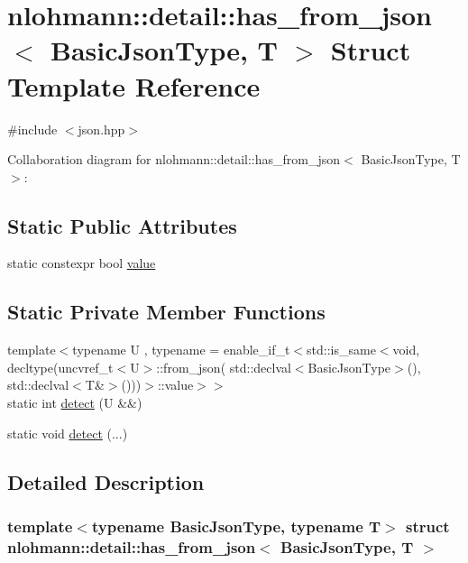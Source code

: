 \hypertarget{structnlohmann_1_1detail_1_1has__from__json}{}\section{nlohmann\+:\+:detail\+:\+:has\+\_\+from\+\_\+json$<$ Basic\+Json\+Type, T $>$ Struct Template Reference}
\label{structnlohmann_1_1detail_1_1has__from__json}


{\ttfamily \#include $<$json.\+hpp$>$}



Collaboration diagram for nlohmann\+:\+:detail\+:\+:has\+\_\+from\+\_\+json$<$ Basic\+Json\+Type, T $>$\+:
\subsection*{Static Public Attributes}
\begin{DoxyCompactItemize}
\item 
static constexpr bool \hyperlink{structnlohmann_1_1detail_1_1has__from__json_a16701d806343c58ae7e884024dd14955}{value}
\end{DoxyCompactItemize}
\subsection*{Static Private Member Functions}
\begin{DoxyCompactItemize}
\item 
{\footnotesize template$<$typename U , typename  = enable\+\_\+if\+\_\+t$<$std\+::is\+\_\+same$<$void, decltype(uncvref\+\_\+t$<$\+U$>$\+::from\+\_\+json(                 std\+::declval$<$\+Basic\+Json\+Type$>$(), std\+::declval$<$\+T\&$>$()))$>$\+::value$>$$>$ }\\static int \hyperlink{structnlohmann_1_1detail_1_1has__from__json_a94e93c638429df773f948f5243fd304b}{detect} (U \&\&)
\item 
static void \hyperlink{structnlohmann_1_1detail_1_1has__from__json_a6894294c2b238bd02364ba1943e759dd}{detect} (...)
\end{DoxyCompactItemize}


\subsection{Detailed Description}
\subsubsection*{template$<$typename Basic\+Json\+Type, typename T$>$\newline
struct nlohmann\+::detail\+::has\+\_\+from\+\_\+json$<$ Basic\+Json\+Type, T $>$}



